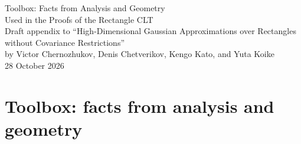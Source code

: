\documentclass[11pt,letterpaper]{article}
\theoremstyle{plain}
\begin{document}
\begin{center}
{\Large Toolbox: Facts from Analysis and Geometry\\[0.15em]
Used in the Proofs of the Rectangle CLT}\\[0.85em]
{\normalsize Draft appendix to ``High-Dimensional Gaussian Approximations over
Rectangles without Covariance Restrictions''\\
by Victor Chernozhukov, Denis Chetverikov, Kengo Kato, and Yuta Koike}\\[0.65em]
{\normalsize 28 October 2026}
\end{center}
\bigskip

\appendix
\setcounter{section}{5}
%   

\makeatletter
\providecommand{\E}{\mathbb E}
\providecommand{\Pp}{\mathbb P}
\providecommand{\R}{\mathbb R}
\providecommand{\tr}{\operatorname{tr}}
\providecommand{\op}{\mathrm{op}}
\providecommand{\norm}[1]{\left\lVert#1\right\rVert}
\providecommand{\ind}{\mathbf 1}
\providecommand{\dd}{\,d}
\providecommand{\Hh}{H_2}
\providecommand{\surf}{\mathcal J}
\providecommand{\relint}{\operatorname{relint}}
\providecommand{\aff}{\operatorname{aff}}
\providecommand{\cone}{\operatorname{cone}}
\providecommand{\dist}{\operatorname{dist}}
\providecommand{\prj}{\operatorname{pr}}
\providecommand{\Haus}{\mathcal H}
\providecommand{\TBc}[1]{[#1]}
\providecommand{\PN}[2]{\ifdefined\toolboxinpaper\ref{#1}\else#2\fi}
\providecommand{\PR}[3]{#1~\PN{#2}{#3}}
\providecommand{\PE}[2]{(\PN{#1}{#2})}
\providecommand{\usedin}[1]{\par\smallskip\noindent{\small\emph{Used in:} #1}\par\smallskip}
\makeatother

\section{Toolbox: facts from analysis and geometry}\label{app:toolbox}
\end{document}
